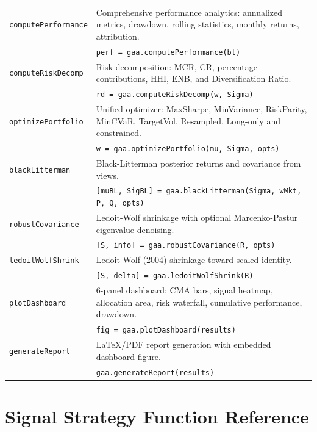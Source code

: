 \documentclass[11pt,a4paper]{article}
\begin{document}
\begin{longtable}{p{3.8cm} p{11.2cm}}
\midrule
\texttt{computePerformance} & Comprehensive performance analytics: annualized metrics, drawdown, rolling statistics, monthly returns, attribution. \\
& {\small\texttt{perf = gaa.computePerformance(bt)}} \\
\midrule
\texttt{computeRiskDecomp} & Risk decomposition: MCR, CR, percentage contributions, HHI, ENB, and Diversification Ratio. \\
& {\small\texttt{rd = gaa.computeRiskDecomp(w, Sigma)}} \\
\midrule
\texttt{optimizePortfolio} & Unified optimizer: MaxSharpe, MinVariance, RiskParity, MinCVaR, TargetVol, Resampled. Long-only and constrained. \\
& {\small\texttt{w = gaa.optimizePortfolio(mu, Sigma, opts)}} \\
\midrule
\texttt{blackLitterman} & Black-Litterman posterior returns and covariance from views. \\
& {\small\texttt{[muBL, SigBL] = gaa.blackLitterman(Sigma, wMkt, P, Q, opts)}} \\
\midrule
\texttt{robustCovariance} & Ledoit-Wolf shrinkage with optional Marcenko-Pastur eigenvalue denoising. \\
& {\small\texttt{[S, info] = gaa.robustCovariance(R, opts)}} \\
\midrule
\texttt{ledoitWolfShrink} & Ledoit-Wolf (2004) shrinkage toward scaled identity. \\
& {\small\texttt{[S, delta] = gaa.ledoitWolfShrink(R)}} \\
\midrule
\texttt{plotDashboard} & 6-panel dashboard: CMA bars, signal heatmap, allocation area, risk waterfall, cumulative performance, drawdown. \\
& {\small\texttt{fig = gaa.plotDashboard(results)}} \\
\midrule
\texttt{generateReport} & LaTeX/PDF report generation with embedded dashboard figure. \\
& {\small\texttt{gaa.generateReport(results)}} \\
\bottomrule
\end{longtable}
\newpage
\section{Signal Strategy Function Reference}
\end{document}
